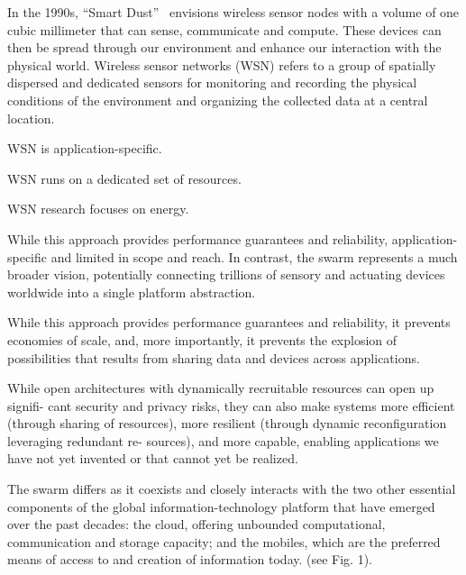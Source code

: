 In the 1990s, ``Smart Dust''~\cite{kahn1999next} envisions wireless sensor nodes
with a volume of one cubic millimeter that can sense, communicate and
compute. These devices can then be spread through our environment and enhance
our interaction with the physical world. Wireless sensor networks (WSN) refers
to a group of spatially dispersed and dedicated sensors for monitoring and
recording the physical conditions of the environment and organizing the
collected data at a central location.

WSN is application-specific.

WSN runs on a dedicated set of resources.

WSN research focuses on energy.

While this approach provides performance guarantees and reliability,
application-specific and limited in scope and reach. In contrast, the swarm
represents a much broader vision, potentially connecting trillions of sensory
and actuating devices worldwide into a single platform abstraction.

While this approach provides performance guarantees and reliability, it prevents
economies of scale, and, more importantly, it prevents the explosion of
possibilities that results from sharing data and devices across applications.

While open architectures with dynamically recruitable resources can open up
signifi- cant security and privacy risks, they can also make systems more
efficient (through sharing of resources), more resilient (through dynamic
reconfiguration leveraging redundant re- sources), and more capable, enabling
applications we have not yet invented or that cannot yet be realized.

The swarm differs as it coexists and closely interacts with the two other
essential components of the global information-technology platform that have
emerged over the past decades: the cloud, offering unbounded computational,
communication and storage capacity; and the mobiles, which are the preferred
means of access to and creation of information today. (see Fig. 1).

